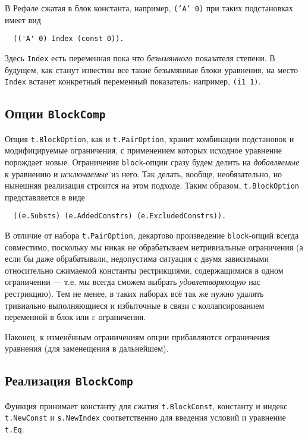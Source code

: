\documentclass[12pt]{article}
\begin{document}
В Рефале сжатая в блок константа, например, \texttt{('A' 0)} при таких
подстановках имеет вид
\begin{Verbatim}
  (('A' 0) Index (const 0)).
\end{Verbatim}
Здесь \texttt{Index} есть переменная пока что \textit{безымянного} показателя степени. В будущем,
как станут известны все такие безымянные блоки уравнения, на место
\texttt{Index} встанет конкретный переменный показатель: например,
\texttt{(i1 1)}.


\subsection{Опции \texttt{BlockComp}} \label{block-option}

Опция \texttt{t.BlockOption}, как и \texttt{t.PairOption}, хранит комбинации
подстановок и модифицируемые ограничения, с применением которых исходное
уравнение порождает новые. Ограничения \texttt{block}-опции сразу будем
делить на \textit{добавляемые} к уравнению и \textit{исключаемые} из него. Так
делать, вообще, необязательно, но нынешняя реализация строится на этом подходе.
Таким образом, \texttt{t.BlockOption} представляется в виде
\begin{Verbatim}
  ((e.Substs) (e.AddedConstrs) (e.ExcludedConstrs)). 
\end{Verbatim}

В отличие от набора \texttt{t.PairOption}, декартово произведение
\texttt{block}-опций всегда совместимо, поскольку мы никак не обрабатываем
нетривиальные ограничения (а если бы даже обрабатывали, недопустима ситуация
с двумя зависимыми относительно сжимаемой константы рестрикциями, содержащимися
в одном ограничении --- т.е. мы всегда сможем выбрать \textit{удовлетворяющую}
нас рестрикцию). Тем не менее, в таких наборах всё так же нужно удалять
тривиально выполняющиеся и избыточные в связи с коллапсированием переменной в
блок или $\varepsilon$ ограничения.

Наконец, к изменённым ограничениям опции прибавляются ограничения уравнения
(для заменещения в дальнейшем).


\subsection{Реализация \texttt{BlockComp}}

Функция принимает константу для сжатия \texttt{t.BlockConst}, константу
и индекс \texttt{t.NewConst} и \texttt{s.NewIndex} соответственно для введения
условий и уравнение \texttt{t.Eq}.
\end{document}
